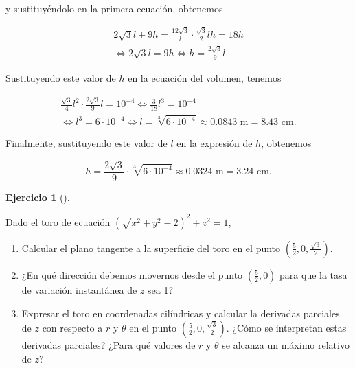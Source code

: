\documentclass[
  spanish,
  a4paper,
]{scrreport}
\theoremstyle{definition}
\newtheorem{exercise}{Ejercicio}[chapter]
\theoremstyle{remark}
\begin{document}
\begin{tcolorbox}
y sustituyéndolo en la primera ecuación, obtenemos

\[
\begin{gathered}
2\sqrt{3}l + 9h = \frac{12\sqrt{3}}{l} \cdot \frac{\sqrt{3}}{2}l h = 18 h \\
\Leftrightarrow 2\sqrt{3}l = 9h 
\Leftrightarrow h = \frac{2\sqrt{3}}{9}l.
\end{gathered}
\]

Sustituyendo este valor de \(h\) en la ecuación del volumen, tenemos

\[
\begin{gathered}
\frac{\sqrt{3}}{4}l^2 \cdot \frac{2\sqrt{3}}{9}l = 10^{-4} 
\Leftrightarrow \frac{3}{18}l^3 = 10^{-4} \\
\Leftrightarrow l^3 = 6 \cdot 10^{-4} 
\Leftrightarrow l = \sqrt[3]{6 \cdot 10^{-4}} \approx 0.0843 \text{ m} = 8.43 \text{ cm}.
\end{gathered}
\]

Finalmente, sustituyendo este valor de \(l\) en la expresión de \(h\),
obtenemos

\[
h = \frac{2\sqrt{3}}{9} \cdot \sqrt[3]{6 \cdot 10^{-4}} \approx 0.0324 \text{ m} = 3.24 \text{ cm}.
\]

\end{tcolorbox}

\begin{exercise}[]\protect\hypertarget{exr-2}{}\label{exr-2}

Dado el toro de ecuación
\(\left(\sqrt{x^{2}+y^{2}}-2\right)^{2}+z^{2}=1\),

\begin{enumerate}
\def\labelenumi{\alph{enumi}.}
\item
  Calcular el plano tangente a la superficie del toro en el punto
  \(\left(\frac{5}{2},0,\frac{\sqrt{3}}{2}\right)\).
\item
  ¿En qué dirección debemos movernos desde el punto \((\frac{5}{2},0)\)
  para que la tasa de variación instantánea de \(z\) sea 1?
\item
  Expresar el toro en coordenadas cilíndricas y calcular la derivadas
  parciales de \(z\) con respecto a \(r\) y \(\theta\) en el punto
  \(\left(\frac{5}{2},0,\frac{\sqrt{3}}{2}\right)\). ¿Cómo se
  interpretan estas derivadas parciales? ¿Para qué valores de \(r\) y
  \(\theta\) se alcanza un máximo relativo de \(z\)?
\end{enumerate}

\end{exercise}
\end{document}
